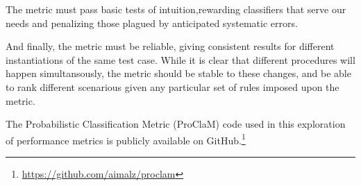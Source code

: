 The metric must pass basic tests of intuition,rewarding classifiers that serve our needs and penalizing those plagued by anticipated systematic errors.

And finally, the metric must be reliable, giving consistent results for different instantiations of the same test case.
While it is clear that different procedures will happen simultansously, the metric should be stable to these changes, and be able to rank different scenarious given any particular set of rules imposed upon the metric.

The Probabilistic Classification Metric (ProClaM) code used in this exploration of performance metrics is publicly available on GitHub.\footnote{\url{https://github.com/aimalz/proclam}}
